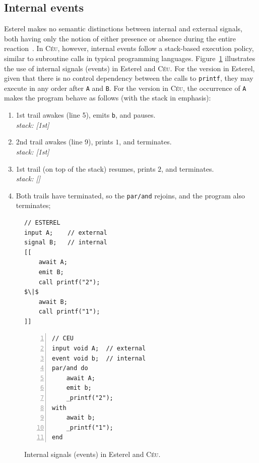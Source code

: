 \documentclass{acm_proc_article-sp}
\newcommand{\CEU}{\textsc{C\'{e}u}\xspace}
\newcommand{\code}[1] {{\small{\texttt{#1}}}}
\newcommand{\1}{\;}
\newcommand{\2}{\;\;}
\newcommand{\3}{\;\;\;}
\newcommand{\5}{\;\;\;\;\;}
\begin{document}
\subsection{Internal events}
\label{sec.ceu.ints}

Esterel makes no semantic distinctions between internal and external signals, 
both having only the notion of either presence or absence during the entire 
reaction~\cite{esterel.preemption}.
%
In \CEU, however, internal events follow a stack-based execution policy, 
similar to subroutine calls in typical programming languages.
%
Figure~\ref{lst.prints} illustrates the use of internal signals (events) in 
Esterel and \CEU.
%
For the version in Esterel, given that there is no control dependency between 
the calls to \code{printf}, they may execute in any order after \code{A} and 
\code{B}.
%
For the version in \CEU, the occurrence of \code{A} makes the program behave as 
follows (with the stack in emphasis):
%
{\small
\begin{enumerate}
\setlength{\itemsep}{0pt}
\item 1st trail awakes (line 5), emits \code{b}, and pauses.\\
    \emph{stack: [1st]}
\item 2nd trail awakes (line 9), prints $1$, and terminates.\\
    \emph{stack: [1st]}
\item 1st trail (on top of the stack) resumes, prints $2$, and terminates.\\
    \emph{stack: []}
\item Both trails have terminated, so the \code{par/and} rejoins, and the 
program also terminates;
\end{enumerate}
}

\begin{figure}[!t]
\begin{minipage}[t]{0.43\linewidth}
\begin{lstlisting}[mathescape=true]
// ESTEREL
input A;    // external
signal B;   // internal
[[
    await A;
    emit B;
    call printf("2");
$\|$
    await B;
    call printf("1");
]]
\end{lstlisting}
\end{minipage}
%
\begin{minipage}[t]{0.56\linewidth}
\begin{lstlisting}[numbers=left,xleftmargin=3.1em]
// CEU
input void A;  // external
event void b;  // internal
par/and do
    await A;
    emit b;
    _printf("2");
with
    await b;
    _printf("1");
end
\end{lstlisting}
\end{minipage}
\caption{ Internal signals (events) in Esterel and \CEU. \newline
\label{lst.prints}
}
\end{figure}
\end{document}
